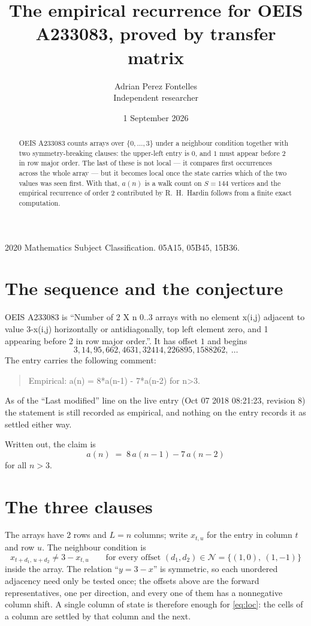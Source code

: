 \documentclass[11pt,a4paper]{article}
\title{The empirical recurrence for OEIS A233083, proved by transfer matrix}
\author{Adrian Perez Fontelles\\ \small Independent researcher}
\date{1 September 2026}
\theoremstyle{plain}
\theoremstyle{definition}
\begin{document}
\maketitle

\begin{abstract}
OEIS A233083 counts arrays over $\{0,\dots,3\}$ under a neighbour condition together with
two symmetry-breaking clauses: the upper-left entry is $0$, and $1$ must appear before
$2$ in row major order. The last of these is not local --- it compares first occurrences
across the whole array --- but it becomes local once the state carries which of the two values
was seen first. With that, $a(n)$ is a walk count on $S=144$ vertices and the empirical
recurrence of order $2$ contributed by R.~H.~Hardin follows from a finite exact
computation.
\end{abstract}

\noindent\small 2020 Mathematics Subject Classification. 05A15, 05B45, 15B36.\normalsize

\section{The sequence and the conjecture}

OEIS A233083 is ``Number of 2 X n 0..3 arrays with no element x(i,j) adjacent to value 3-x(i,j) horizontally or antidiagonally, top left element zero, and 1 appearing before 2 in row major order.''. It has offset $1$ and begins
\[
3, 14, 95, 662, 4631, 32414, 226895, 1588262,\ \dots
\]
The entry carries the following comment:
\begin{quote}\small
Empirical: a(n) = 8*a(n-1) - 7*a(n-2) for n>3.
\end{quote}
As of the ``Last modified'' line on the live entry (Oct 07 2018 08:21:23, revision 8) the statement is
still recorded as empirical, and nothing on the entry records it as settled either way.

Written out, the claim is
\begin{equation}\label{eq:conj}
a(n)\;=\;8\,a(n-1) - 7\,a(n-2)
\end{equation}
for all $n>3$.

\section{The three clauses}

The arrays have $2$ rows and $L=n$ columns; write $x_{t,u}$ for the entry in
column $t$ and row $u$. The neighbour condition is
\begin{equation}\label{eq:loc}
x_{t+d_1,\,u+d_2}\ne 3-x_{t,u}\qquad\text{for every offset }(d_1,d_2)\in\mathcal N=\{(1,0),\ (1,-1)\}
\end{equation}
inside the array. The relation ``$y=3-x$'' is symmetric, so each unordered adjacency need
only be tested once; the offsets above are the forward representatives, one per direction,
and every one of them has a nonnegative column shift. A single column of state is therefore
enough for \eqref{eq:loc}: the cells of a column are settled by that column and the next.
\end{document}

